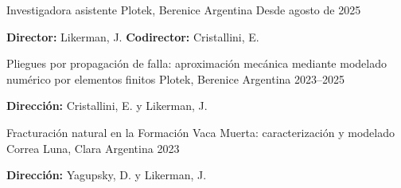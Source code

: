

\begin{cventries}
\cventry
    {Investigadora asistente}
    {Plotek, Berenice}
    {Argentina}
    {Desde agosto de 2025}
    {
      \begin{cvitems}
        \item {\textbf{Director:} Likerman, J. \textbf{Codirector:} Cristallini, E.}
      \end{cvitems}
    }
\end{cventries}


\begin{cventries}
\cventry
    {Pliegues por propagación de falla: aproximación mecánica mediante modelado numérico por elementos finitos}
    {Plotek, Berenice}
    {Argentina}
    {2023--2025}
    {
      \begin{cvitems}
        \item {\textbf{Dirección:} Cristallini, E. y Likerman, J.}
      \end{cvitems}
    }
\end{cventries}


\begin{cventries}
\cventry
    {Fracturación natural en la Formación Vaca Muerta: caracterización y modelado}
    {Correa Luna, Clara}
    {Argentina}
    {2023}
    {
      \begin{cvitems}
        \item {\textbf{Dirección:} Yagupsky, D. y Likerman, J.}
      \end{cvitems}
    }
\end{cventries}


